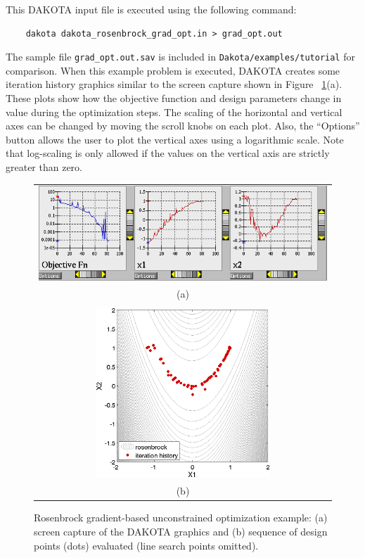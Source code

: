 This DAKOTA input file is executed using the following command:
\begin{small}
\begin{verbatim}
    dakota dakota_rosenbrock_grad_opt.in > grad_opt.out
\end{verbatim}
\end{small}

The sample file \texttt{grad\_opt.out.sav} is included in
\texttt{Dakota/examples/tutorial} for comparison. When this
example problem is executed, DAKOTA creates some iteration history
graphics similar to the screen capture shown in Figure~
\ref{tutorial:rosenbrock_grad_graphics}(a). These plots show
how the objective function and design parameters change in value
during the optimization steps. The scaling of the horizontal and
vertical axes can be changed by moving the scroll knobs on each plot.
Also, the ``Options'' button allows the user to plot the vertical axes
using a logarithmic scale.  Note that log-scaling is only allowed if
the values on the vertical axis are strictly greater than zero.

\begin{figure}[ht!]
  \centering
  \begin{tabular}{c}
  \includegraphics[width=\textwidth]{images/dak_graphics_grad_opt}\\
  (a)\\
  \qquad\\
  \includegraphics[height=2.5in]{images/rosen_grad_opt_pts} \\
  (b)
  \end{tabular}
  \caption{Rosenbrock gradient-based unconstrained optimization
    example: (a) screen capture of the DAKOTA graphics and (b)
    sequence of design points (dots) evaluated (line search points
    omitted).}
  \label{tutorial:rosenbrock_grad_graphics}
\end{figure}

